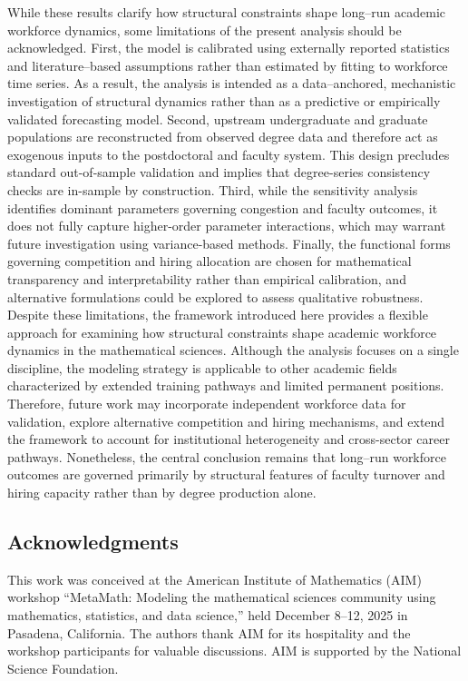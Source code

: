 \documentclass[3p]{elsarticle}%
\theoremstyle{definition}
\begin{document}
\noindent While these results clarify how structural constraints shape long--run academic workforce dynamics, some limitations of the present analysis should be acknowledged. First, the model is calibrated using externally reported statistics and literature--based assumptions rather than estimated by fitting to workforce time series. As a result, the analysis is intended as a data--anchored, mechanistic investigation of structural dynamics rather than as a predictive or empirically validated forecasting model. Second, upstream undergraduate and graduate populations are reconstructed from observed degree data and therefore act as exogenous inputs to the postdoctoral and faculty system. This design precludes standard out-of-sample validation and implies that degree-series consistency checks are in-sample by construction. Third, while the sensitivity analysis identifies dominant parameters governing congestion and faculty outcomes, it does not fully capture higher-order parameter interactions, which may warrant future investigation using variance-based methods. Finally, the functional forms governing competition and hiring allocation are chosen for mathematical transparency and interpretability rather than empirical calibration, and alternative formulations could be explored to assess qualitative robustness. Despite these limitations, the framework introduced here provides a flexible approach for examining how structural constraints shape academic workforce dynamics in the mathematical sciences. Although the analysis focuses on a single discipline, the modeling strategy is applicable to other academic fields characterized by extended training pathways and limited permanent positions. Therefore, future work may incorporate independent workforce data for validation, explore alternative competition and hiring mechanisms, and extend the framework to account for institutional heterogeneity and cross-sector career pathways. Nonetheless, the central conclusion remains that long--run workforce outcomes are governed primarily by structural features of faculty turnover and hiring capacity rather than by degree production alone.



\subsection*{Acknowledgments}
  \noindent This work was conceived at the American Institute of Mathematics (AIM) workshop ``MetaMath: Modeling the mathematical sciences community using mathematics, statistics, and data science,'' held December 8--12, 2025 in Pasadena, California. The authors thank AIM for its hospitality and the workshop participants for valuable discussions. AIM is supported by the National Science Foundation.
\end{document}
